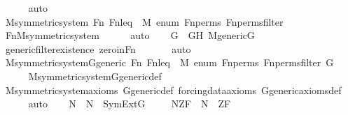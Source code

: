 \begin{isabellebody}
\ \ \ \ \isamarkupfalse%
\ auto\isanewline
\ \ \isamarkupfalse%
\ M{\isacharunderscore}{\kern0pt}symmetric{\isacharunderscore}{\kern0pt}system\ Fn\ Fn{\isacharunderscore}{\kern0pt}leq\ {}\ M\ enum\ Fn{\isacharunderscore}{\kern0pt}perms\ Fn{\isacharunderscore}{\kern0pt}perms{\isacharunderscore}{\kern0pt}filter\ \ \isanewline
\ \ \ \ \isamarkupfalse%
\ Fn{\isacharunderscore}{\kern0pt}M{\isacharunderscore}{\kern0pt}symmetric{\isacharunderscore}{\kern0pt}system\isanewline
\ \ \ \ \isamarkupfalse%
\ auto\isanewline
\isanewline
\ \ \isamarkupfalse%
\ G\ \ GH{\isacharcolon}{\kern0pt}\ {\isachardoublequoteopen}M{\isacharunderscore}{\kern0pt}generic{\isacharparenleft}{\kern0pt}G{\isacharparenright}{\kern0pt}{\isachardoublequoteclose}\ \isanewline
\ \ \ \ \isamarkupfalse%
\ generic{\isacharunderscore}{\kern0pt}filter{\isacharunderscore}{\kern0pt}existence\ zero{\isacharunderscore}{\kern0pt}in{\isacharunderscore}{\kern0pt}Fn\ \isanewline
\ \ \ \ \isamarkupfalse%
\ auto\isanewline
\ \ \isamarkupfalse%
\ \isamarkupfalse%
\ M{\isacharunderscore}{\kern0pt}symmetric{\isacharunderscore}{\kern0pt}system{\isacharunderscore}{\kern0pt}G{\isacharunderscore}{\kern0pt}generic\ Fn\ Fn{\isacharunderscore}{\kern0pt}leq\ {}\ M\ enum\ Fn{\isacharunderscore}{\kern0pt}perms\ Fn{\isacharunderscore}{\kern0pt}perms{\isacharunderscore}{\kern0pt}filter\ G\isanewline
\ \ \ \ \isamarkupfalse%
\ M{\isacharunderscore}{\kern0pt}symmetric{\isacharunderscore}{\kern0pt}system{\isacharunderscore}{\kern0pt}G{\isacharunderscore}{\kern0pt}generic{\isacharunderscore}{\kern0pt}def\isanewline
\ \ \ \ \isamarkupfalse%
\ M{\isacharunderscore}{\kern0pt}symmetric{\isacharunderscore}{\kern0pt}system{\isacharunderscore}{\kern0pt}axioms\ G{\isacharunderscore}{\kern0pt}generic{\isacharunderscore}{\kern0pt}def\ forcing{\isacharunderscore}{\kern0pt}data{\isacharunderscore}{\kern0pt}axioms\ G{\isacharunderscore}{\kern0pt}generic{\isacharunderscore}{\kern0pt}axioms{\isacharunderscore}{\kern0pt}def\ \isanewline
\ \ \ \ \isamarkupfalse%
\ auto\isanewline
\isanewline
\ \ \isamarkupfalse%
\ N\ \ {\isachardoublequoteopen}N\ {\isasymequiv}\ SymExt{\isacharparenleft}{\kern0pt}G{\isacharparenright}{\kern0pt}{\isachardoublequoteclose}\ \isanewline
\isanewline
\ \ \isamarkupfalse%
\ N{\isacharunderscore}{\kern0pt}ZF\ {\isacharcolon}{\kern0pt}\ {\isachardoublequoteopen}N\ {\isasymTurnstile}\ ZF{\isachardoublequoteclose}\ \isanewline

\end{isabellebody}
